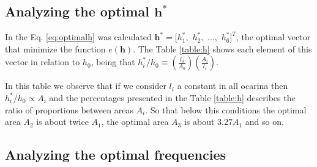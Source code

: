 \documentclass[11pt,twocolumn]{article}
\begin{document}
\subsection{Analyzing the optimal $\mathbf{h^*}$}
In the Eq. \ref{eq:optimalh} was calculated $\mathbf{h^*}=[h_1^*,$ $h_2^*,$ $...,$ $h_6^*]^{T}$, 
the optimal vector that minimize the function $e(\mathbf{h})$. 
The Table \ref{table:h} shows each element of this vector in relation to $h_0$, 
being that $ h_{i}^*/h_{0} \equiv  \left( \frac{l_0}{A_0}\right) \left( \frac{A_{i}}{l_{i}}    \right)$.
\begin{table}[h]
\center
{}
\caption{Percentage ratio between $h_{i}^*$ and $h_{0}$.}
\label{table:h}
\end{table}

In this table we observe that if 
we consider $l_{i}$ a constant in all ocarina 
then $h_{i}^*/h_{0} \propto A_{i}$ and 
the percentages presented in the Table \ref{table:h} describes the ratio of proportions between areas $A_i$.
So that below this conditions 
the optimal area $A_{2}$ is about twice $A_{1}$, 
the optimal area $A_{3}$ is about $3.27 A_{1}$   
and so on.




\subsection{Analyzing the optimal frequencies}
\end{document}
